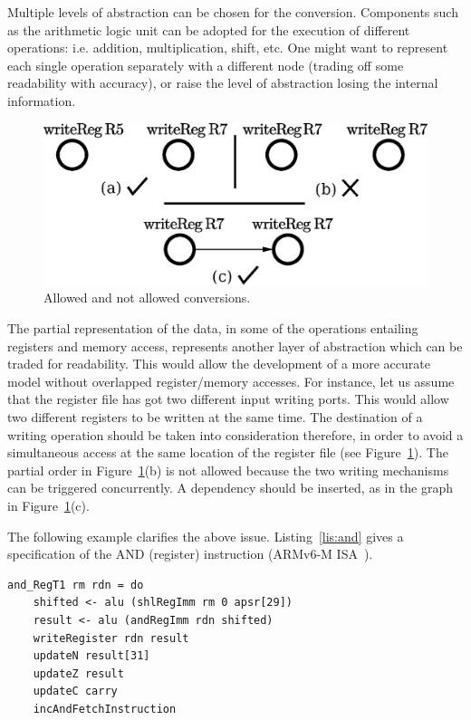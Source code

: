 \documentclass[conference]{IEEEtran}
\begin{document}
Multiple levels of abstraction can be chosen for the conversion. Components such as the
arithmetic logic unit can be adopted for the execution of
different operations: i.e. addition, multiplication, shift, etc. One might want to represent
each single operation separately with a different node 
(trading off some readability with accuracy), or raise the
level of abstraction losing the internal information.

\begin{figure}[ht!]
\begin{center}
	\includegraphics[width=\linewidth]{IMG/depPO.eps}
	\caption{Allowed and not allowed conversions.}
	\label{fig:depPO}
\end{center}
\end{figure}

The partial representation of the data, in some of the operations entailing registers and
memory access, represents another layer of abstraction which can be traded for readability.
This would allow the development of a more accurate model without overlapped register/memory
accesses. For instance, let us assume that the register file has got two different input
writing ports. This would allow two different registers to be written at the same time.
The destination of a writing operation should be taken into consideration therefore,
in order to avoid a simultaneous access at the same location of the register file
(see Figure~\ref{fig:depPO}). The partial order in Figure~\ref{fig:depPO}(b) is not allowed
because the two writing mechanisms can be triggered concurrently.
A dependency should be inserted, as in the graph in Figure~\ref{fig:depPO}(c).

The following example clarifies the above issue. 
Listing~\ref{lis:and} gives a specification of the AND (register) instruction (ARMv6-M ISA~\cite{armManual}).\\

\begin{lstlisting}[caption=AND (register) instruction - Farfalle specification,
frame=single, label=lis:and]
and_RegT1 rm rdn = do
    shifted <- alu (shlRegImm rm 0 apsr[29])
    result <- alu (andRegImm rdn shifted)
    writeRegister rdn result
    updateN result[31]
    updateZ result
    updateC carry
    incAndFetchInstruction
\end{lstlisting}
\end{document}
